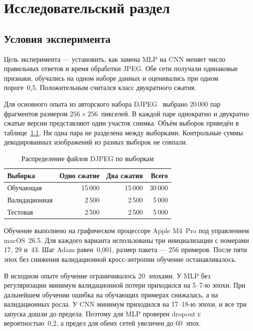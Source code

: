 \chapter{Исследовательский раздел}

\section{Условия эксперимента}

Цель эксперимента --- установить, как замена MLP на CNN меняет число правильных ответов и время обработки JPEG. Обе сети получали одинаковые признаки, обучались на одном наборе данных и оценивались при одном пороге~0,5. Положительным считался класс двукратного сжатия.

Для основного опыта из авторского набора DJPEG~\cite{djpeg_dataset} выбрано 20\,000 пар фрагментов размером $256\times256$~пикселей. В каждой паре однократно и двукратно сжатые версии представляют один участок снимка. Объём выборок приведён в таблице~\ref{tab:splits}. Ни одна пара не разделена между выборками. Контрольные суммы декодированных изображений из разных выборок не совпали.

\begin{table}[htbp]
 \caption{Распределение файлов DJPEG по выборкам}
 \label{tab:splits}
 \centering\small\singlespacing
 \begin{tabular}{@{}lrrr@{}}
 \toprule
 Выборка & Одно сжатие & Два сжатия & Всего \\
 \midrule
 Обучающая & 15\,000 & 15\,000 & 30\,000 \\
 Валидационная & 2\,500 & 2\,500 & 5\,000 \\
 Тестовая & 2\,500 & 2\,500 & 5\,000 \\
 \bottomrule
 \end{tabular}
\end{table}

Обучение выполнено на графическом процессоре Apple M4~Pro под управлением macOS~26.5. Для каждого варианта использованы три инициализации с номерами 17, 29 и~43. Шаг Adam равен~0,001, размер пакета --- 256 примеров. После пяти эпох без снижения валидационной кросс-энтропии обучение останавливалось.

В исходном опыте обучение ограничивалось 20~эпохами. У MLP без регуляризации минимум валидационной потери приходился на 5--7-ю эпохи. При дальнейшем обучении ошибка на обучающих примерах снижалась, а на валидационных росла. У CNN минимум приходился на 17--18-ю эпохи, и все три запуска дошли до предела. Поэтому для MLP проверен dropout с вероятностью~0,2, а предел для обеих сетей увеличен до 60~эпох.

